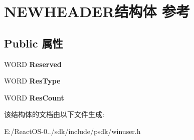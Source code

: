 \hypertarget{struct_n_e_w_h_e_a_d_e_r}{}\section{N\+E\+W\+H\+E\+A\+D\+E\+R结构体 参考}
\label{struct_n_e_w_h_e_a_d_e_r}
\subsection*{Public 属性}
\begin{DoxyCompactItemize}
\item 
\mbox{\label{struct_n_e_w_h_e_a_d_e_r_a74a00f40882ac39e6634508dd4f96bc4}} 
W\+O\+RD {\bfseries Reserved}
\item 
\mbox{\label{struct_n_e_w_h_e_a_d_e_r_a695c3b62991bae120e31f13ad6d4c9db}} 
W\+O\+RD {\bfseries Res\+Type}
\item 
\mbox{\label{struct_n_e_w_h_e_a_d_e_r_a7855cbe6e226a75caed394ee71263faf}} 
W\+O\+RD {\bfseries Res\+Count}
\end{DoxyCompactItemize}


该结构体的文档由以下文件生成\+:\begin{DoxyCompactItemize}
\item 
E\+:/\+React\+O\+S-\/0../sdk/include/psdk/winuser.\+h\end{DoxyCompactItemize}

